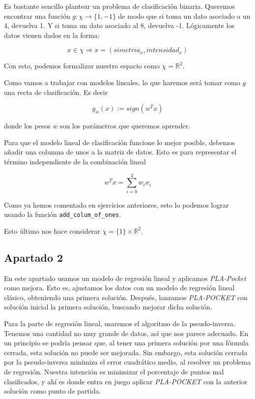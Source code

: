 \documentclass[11pt]{article}
\begin{document}
Es bastante sencillo plantear un problema de clasificación binaria. Queremos encontrar una función $g: \chi \rightarrow \{1, -1\}$ de modo que si toma un dato asociado a un 4, devuelva 1. Y si toma un dato asociado al 8, devuelva -1. Lógicamente los datos vienen dados en la forma:

$$x \in \chi \Rightarrow x = (simetria_x, intensidad_x)$$

Con esto, podemos formalizar nuestro espacio como $\chi = \mathbb{R}^2$.

Como vamos a trabajar con modelos lineales, lo que haremos será tomar como $g$ una recta de clasificación. Es decir

$$g_w(x) := sign(w^T x)$$

donde los pesos $w$ son los parámetros que queremos aprender.

Para que el modelo lineal de clasificación funcione lo mejor posible, debemos añadir una columna de unos a la matriz de datos. Esto es para representar el término independiente de la combinación lineal

$$w^T x = \sum_{i = 0}^{3} w_i x_i$$

Como ya hemos comentado en ejercicios anteriores, esto lo podemos lograr usando la función \lstinline{add_colum_of_ones}.

Esto último nos hace considerar $\chi = \{1\} \times \mathbb{R}^2$.

\pagebreak

\subsection{Apartado 2}

En este apartado usamos un modelo de regresión lineal y aplicamos \emph{PLA-Pocket} como mejora. Esto es, ajustamos los datos con un modelo de regresión lineal clásico, obteniendo una primera solución. Después, lanzamos \emph{PLA-POCKET} con solución inicial la primera solución, buscando mejorar dicha solución.

Para la parte de regresión lineal, usaremos el algoritmo de la pseudo-inversa. Tenemos una cantidad no muy grande de datos, así que nos parece adecuado. En un principio se podría pensar que, al tener una primera solución por una fórmula cerrada, esta solución no puede ser mejorada. Sin embargo, esta solución cerrada por la pseudo-inversa minimiza el error cuadrático medio, al resolver un problema de regresión. Nuestra intención es minimizar el porcentaje de puntos mal clasificados, y ahí es donde entra en juego aplicar \emph{PLA-POCKET} con la anterior solución como punto de partida.
\end{document}
